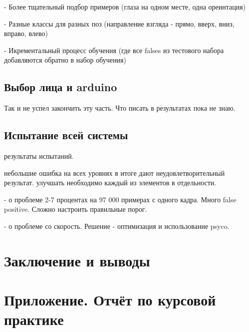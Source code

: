 \documentclass[12pt]{report}
\begin{document}
- Более тщательный подбор примеров (глаза на одном месте, одна ореинтация)

- Разные классы для разных поз (направление взгляда - прямо, вверх, вниз, вправо, влево)

- Икрементальный процесс обучения (где все falses из тестового набора добавляются обратно в набор обучения)
\section{Выбор лица и arduino}
Так и не успел закончить эту часть. Что писать в результатах пока не знаю.
\section{Испытание всей системы}
результаты испытаний.

небольшие ошибка на всех уровнях в итоге дают неудовлетворительный результат. улучшать необходимо каждый из элементов в отдельности.

- о проблеме 2-7 процентах на 97 000 примерах с одного кадра. Много false positive. Сложно настроить правильные порог.

- о проблеме со скорость. Решение - оптимизация и использование psyco.

\chapter*{Заключение и выводы}
\thispagestyle{fancy}


\appendix
\chapter{Приложение. Отчёт по курсовой практике}









\end{document}
